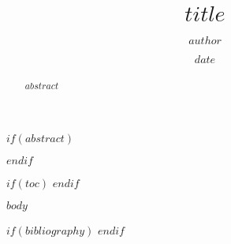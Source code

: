 \documentclass[12pt, a4paper, onecolumn]{article}
\title{$title$}
\author{$author$}
\date{$date$}
\begin{document}
\maketitle
\thispagestyle{empty}

$if(abstract)$
\begin{abstract}
\noindent $abstract$
\end{abstract}
$endif$

$if(toc)$
\tableofcontents
\newpage
$endif$

$body$

$if(bibliography)$
\printbibliography[title=References]
$endif$
\end{document}
